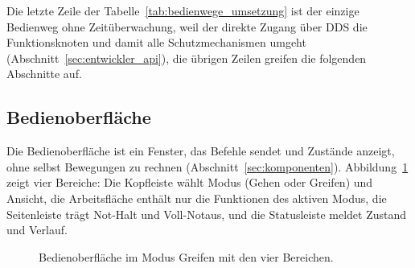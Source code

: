 
Die letzte Zeile der Tabelle~\ref{tab:bedienwege_umsetzung} ist der einzige Bedienweg ohne Zeitüberwachung, weil der direkte Zugang über DDS die Funktionsknoten und damit alle Schutzmechanismen umgeht (Abschnitt~\ref{sec:entwickler_api}), die übrigen Zeilen greifen die folgenden Abschnitte auf.

\subsection{Bedienoberfläche}
\label{sec:bedienoberflaeche}
Die Bedienoberfläche ist ein Fenster, das Befehle sendet und Zustände anzeigt, ohne selbst Bewegungen zu rechnen (Abschnitt~\ref{sec:komponenten}).
Abbildung~\ref{fig:bedienoberflaeche} zeigt vier Bereiche: Die Kopfleiste wählt Modus (Gehen oder Greifen) und Ansicht, die Arbeitsfläche enthält nur die Funktionen des aktiven Modus, die Seitenleiste trägt Not-Halt und Voll-Notaus, und die Statusleiste meldet Zustand und Verlauf.

\begin{figure}[htbp]
  \centering
  \caption[Bedienoberfläche]{Bedienoberfläche im Modus Greifen mit den vier Bereichen.}
  \label{fig:bedienoberflaeche}
\end{figure}

